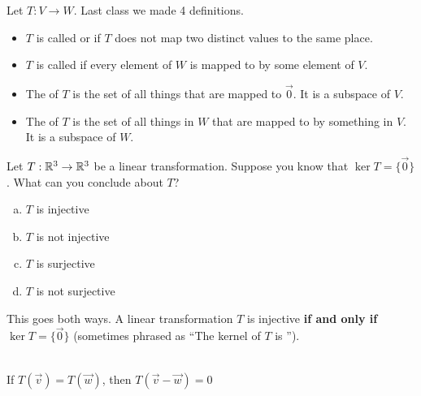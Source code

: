 
\begin{applicationActivities}{3}{19}

\begin{observation}
Let $T: V \rightarrow W$.  Last class we made 4 definitions.
\begin{itemize}
\item  $T$ is called  or  if $T$ does not map two distinct values to the same place.
\item $T$ is called  if every element of $W$ is mapped to by some element of $V$.
\item The  of $T$ is the set of all things that are mapped to $\vec{0}$.  It is a subspace of $V$.
\item The  of $T$ is the set of all things in $W$ that are mapped to by something in $V$.  It is a subspace of $W$.
\end{itemize}
\end{observation}

\begin{activity}{5}
Let $T: \mathbb{R}^3 \rightarrow \mathbb{R}^3$ be a linear transformation.  Suppose you know that $\ker T = \{ \vec{0} \}$.  What can you conclude about $T$?
\begin{enumerate}[(a)]
\item $T$ is injective
\item $T$ is not injective
\item $T$ is surjective
\item $T$ is not surjective
\end{enumerate}
\end{activity}

\begin{fact}
This goes both ways.  A linear transformation $T$ is injective {\bf if and only if} $\ker T = \{\vec{0}\}$ (sometimes phrased as ``The kernel of $T$ is '').

\ \\
If $T(\vec{v})=T(\vec{w})$, then $T(\vec{v}-\vec{w})=0$
\end{fact}


\end{applicationActivities}
